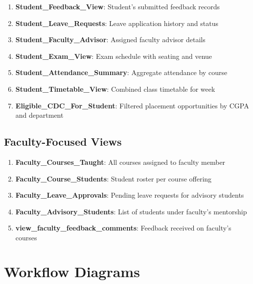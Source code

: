 \documentclass[12pt]{article}
\begin{document}
\begin{enumerate}
    \item \textbf{Student\_Feedback\_View}: Student's submitted feedback records
    
    \item \textbf{Student\_Leave\_Requests}: Leave application history and status
    
    \item \textbf{Student\_Faculty\_Advisor}: Assigned faculty advisor details
    
    \item \textbf{Student\_Exam\_View}: Exam schedule with seating and venue
    
    \item \textbf{Student\_Attendance\_Summary}: Aggregate attendance by course
    
    \item \textbf{Student\_Timetable\_View}: Combined class timetable for week
    
    \item \textbf{Eligible\_CDC\_For\_Student}: Filtered placement opportunities by CGPA and department
\end{enumerate}

\subsection{Faculty-Focused Views}

\begin{enumerate}
    \item \textbf{Faculty\_Courses\_Taught}: All courses assigned to faculty member
    
    \item \textbf{Faculty\_Course\_Students}: Student roster per course offering
    
    \item \textbf{Faculty\_Leave\_Approvals}: Pending leave requests for advisory students
    
    \item \textbf{Faculty\_Advisory\_Students}: List of students under faculty's mentorship
    
    \item \textbf{view\_faculty\_feedback\_comments}: Feedback received on faculty's courses
\end{enumerate}

\newpage

\section{Workflow Diagrams}
\end{document}

